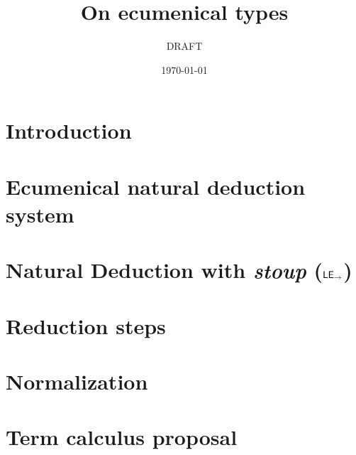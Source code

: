 \documentclass{article}
\date{\today}
\title{On ecumenical types}
\author{DRAFT}
\begin{document}
\maketitle

\section{Introduction}\label{sec:intro}


\section{Ecumenical natural deduction system}\label{sec:ec}


\section{Natural Deduction with \textit{stoup} ($\mathsf{LE}_{\to}$)}\label{sec:nd}


\section{Reduction steps}\label{sec:red}



\section{Normalization}\label{sec:norm}


\section{Term calculus proposal}\label{sec:types}




\end{document}
